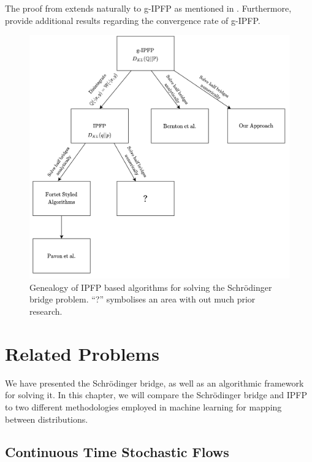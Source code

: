 \documentclass[a4paper,12pt,twoside,openright]{report}
\theoremstyle{definition}
\begin{document}
The proof from \cite{ruschendorf1995convergence} extends naturally to g-IPFP as mentioned in \cite{bernton2019schr}. Furthermore, \cite{bernton2019schr} provide additional results regarding the convergence rate of g-IPFP.
\begin{figure}[h!]
    \centering
    \includegraphics[width=\linewidth]{images/IPFP_Geanology.png}
    \caption{Genealogy of IPFP based algorithms for solving the Schrödinger bridge problem. ``?'' symbolises an area with out much prior research. }
    \label{fig:genealogy}
\end{figure}

\chapter{Related Problems}
We have presented the Schrödinger bridge, as well as an algorithmic framework for solving it. In this chapter, we will compare the Schrödinger bridge and IPFP to two different methodologies employed in machine learning for mapping between distributions. 
\section{Continuous Time Stochastic Flows}
\end{document}
